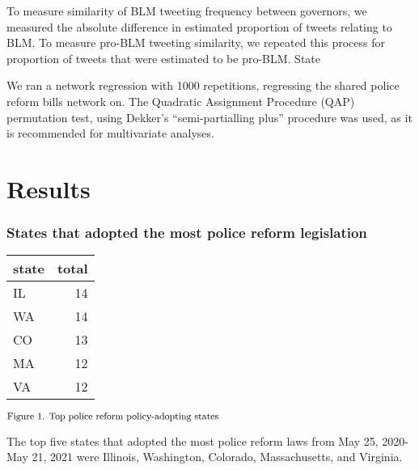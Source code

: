 \documentclass[12pt]{article}
\begin{document}
To measure similarity of BLM tweeting frequency between governors, we
measured the absolute difference in estimated proportion of tweets
relating to BLM. To measure pro-BLM tweeting similarity, we repeated
this process for proportion of tweets that were estimated to be pro-BLM.
State

We ran a network regression with 1000 repetitions, regressing the shared
police reform bills network on. The Quadratic Assignment Procedure (QAP)
permutation test, using Dekker's ``semi-partialling plus'' procedure was
used, as it is recommended for multivariate analyses.

\hypertarget{results}{%
\section{Results}\label{results}}

\hypertarget{states-that-adopted-the-most-police-reform-legislation}{%
\subsubsection{States that adopted the most police reform
legislation}\label{states-that-adopted-the-most-police-reform-legislation}}

\begin{longtable}[]{@{}lr@{}}
\toprule()
state & total \\
\midrule()
\endhead
IL & 14 \\
WA & 14 \\
CO & 13 \\
MA & 12 \\
VA & 12 \\
\bottomrule()
\end{longtable}

\(\hspace*{\fill} \footnotesize \text{Figure 1. Top police reform policy-adopting states}\)

The top five states that adopted the most police reform laws from May
25, 2020-May 21, 2021 were Illinois, Washington, Colorado,
Massachusetts, and Virginia.
\end{document}
